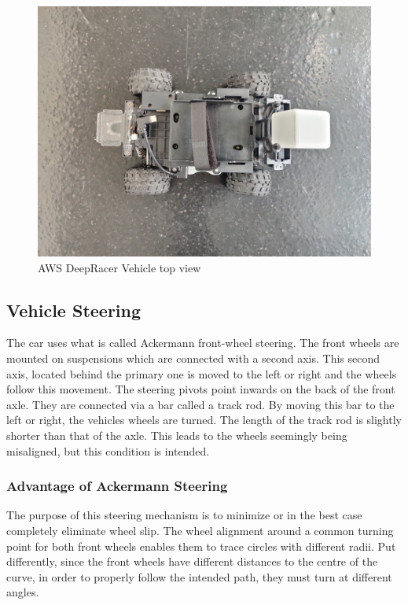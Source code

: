 \begin{figure}
    \centering
    \includegraphics[width=.85\textwidth]{images/car_top_view.jpg}
    \caption{AWS DeepRacer Vehicle top view}
    \label{fig:vehicle_front}
\end{figure}

\subsection{Vehicle Steering}
The car uses what is called Ackermann front-wheel steering. The front wheels are mounted on suspensions which are connected with a second axis. This second axis, located behind the primary one is moved to the left or right and the wheels follow this movement. The steering pivots point inwards on the back of the front axle. They are connected via a bar called a track rod. By moving this bar to the left or right, the vehicles wheels are turned. The length of the track rod is slightly shorter than that of the axle. This leads to the wheels seemingly being misaligned, but this condition is intended.

\subsubsection{Advantage of Ackermann Steering}
The purpose of this steering mechanism is to minimize or in the best case completely eliminate wheel slip. The wheel alignment around a common turning point for both front wheels enables them to trace circles with different radii. Put differently, since the front wheels have different distances to the centre of the curve, in order to properly follow the intended path, they must turn at different angles.

